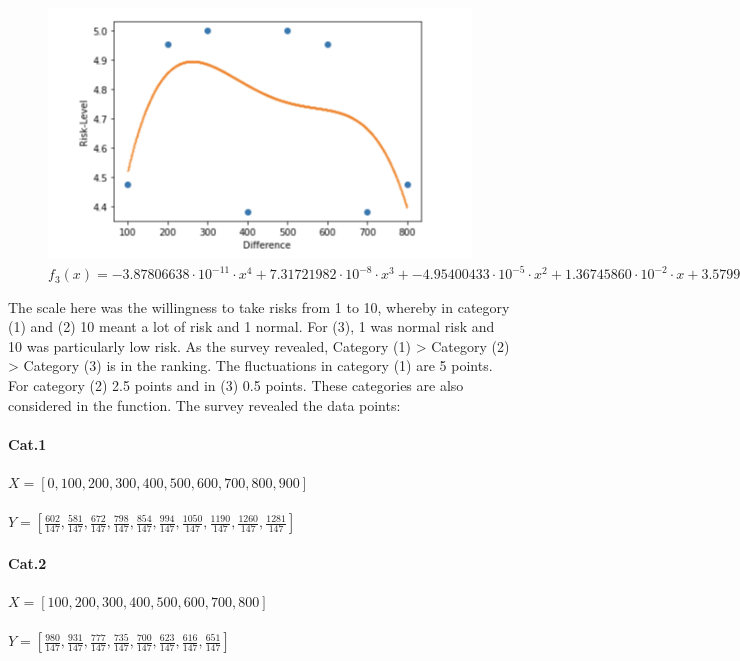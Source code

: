 \begin{figure}[ht]
    \centering
    \includegraphics[width=1\linewidth]{Bilder/risk_level_diffrence_nonlinear}
    \caption{$f_3(x)=-3.87806638\cdot 10^{-11}\cdot x^4+7.31721982\cdot 10^{-8}\cdot x^3+ -4.95400433\cdot 10^{-5} \cdot x^2+ 1.36745860 \cdot 10^{-2} \cdot x+3.57993197$}
    \label{fig:12}
\end{figure}

The scale here was the willingness to take risks from 1 to 10, whereby in category (1) and (2) 10 meant a lot of risk and 1 normal. For (3), 1 was normal risk and 10 was particularly low risk.
 As the survey revealed, Category (1) > Category (2) > Category (3) is in the ranking. The fluctuations in category (1) are 5 points.
 For category (2) 2.5 points and in (3) 0.5 points. These categories are also considered in the function.
The survey revealed the data points:
\paragraph{Cat.1}
$X=[0,100,200,300,400,500,600,700,800,900]$ \\ \\
$Y=[\frac{602}{147},\frac{581}{147},\frac{672}{147},\frac{798}{147},\frac{854}{147},\frac{994}{147},\frac{1050}{147},\frac{1190}{147},\frac{1260}{147},\frac{1281}{147}]$
\paragraph{Cat.2}\par
$X=[100,200,300,400,500,600,700,800]$ \\ \\
$Y=[\frac{980}{147},\frac{931}{147},\frac{777}{147},\frac{735}{147},\frac{700}{147},\frac{623}{147},\frac{616}{147},\frac{651}{147}]$
